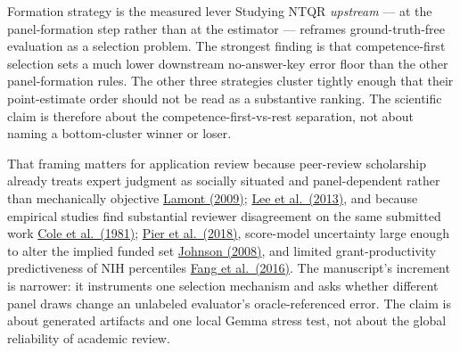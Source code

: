 \documentclass[
  ignorenonframetext,
]{beamer}
\begin{document}
\begin{frame}[allowframebreaks]{Formation strategy is the measured
lever}
\protect{}\label{formation-strategy-is-the-measured-lever}
Studying NTQR \emph{upstream} --- at the panel-formation step rather
than at the estimator --- reframes ground-truth-free evaluation as a
selection problem. The strongest finding is that competence-first
selection sets a much lower downstream no-answer-key error floor than
the other panel-formation rules. The other three strategies cluster
tightly enough that their point-estimate order should not be read as a
substantive ranking. The scientific claim is therefore about the
competence-first-vs-rest separation, not about naming a bottom-cluster
winner or loser.

That framing matters for application review because peer-review
scholarship already treats expert judgment as socially situated and
panel-dependent rather than mechanically objective
\href{https://doi.org/10.4159/9780674054158}{Lamont (2009)};
\href{https://doi.org/10.1002/asi.22784}{Lee et al.~(2013)}, and because
empirical studies find substantial reviewer disagreement on the same
submitted work \href{https://doi.org/10.1126/science.7302566}{Cole et
al.~(1981)}; \href{https://doi.org/10.1073/pnas.1714379115}{Pier et
al.~(2018)}, score-model uncertainty large enough to alter the implied
funded set \href{https://doi.org/10.1073/pnas.0804538105}{Johnson
(2008)}, and limited grant-productivity predictiveness of NIH
percentiles \href{https://doi.org/10.7554/eLife.13323}{Fang et
al.~(2016)}. The manuscript's increment is narrower: it instruments one
selection mechanism and asks whether different panel draws change an
unlabeled evaluator's oracle-referenced error. The claim is about
generated artifacts and one local Gemma stress test, not about the
global reliability of academic review.


\end{frame}
\end{document}
